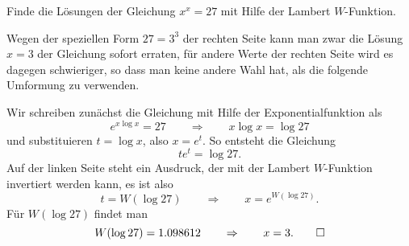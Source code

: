 Finde die Lösungen der Gleichung $x^x=27$ mit Hilfe der Lambert $W$-Funktion.

\begin{loesung}
Wegen der speziellen Form $27=3^3$ der rechten Seite kann man
zwar die Lösung $x=3$ der Gleichung sofort erraten, für andere 
Werte der rechten Seite wird es dagegen schwieriger, so dass man
keine andere Wahl hat, als die folgende Umformung zu verwenden.

Wir schreiben zunächst die Gleichung mit Hilfe der Exponentialfunktion als
\[
e^{x\log x} = 27
\qquad\Rightarrow\qquad
x\log x = \log 27
\]
und substituieren $t=\log x$, also $x=e^t$. 
So entsteht die Gleichung
\[
te^t = \log 27.
\]
Auf der linken Seite steht ein Ausdruck, der mit der Lambert $W$-Funktion
invertiert werden kann, es ist also
\[
t = W(\log 27)
\qquad\Rightarrow\qquad
x=e^{W(\log 27)}.
\]
Für $W(\log 27)$ findet man
\[
W(\log 27) = 1.098612
\qquad\Rightarrow\qquad
x=3.
\qedhere
\]
\end{loesung}
